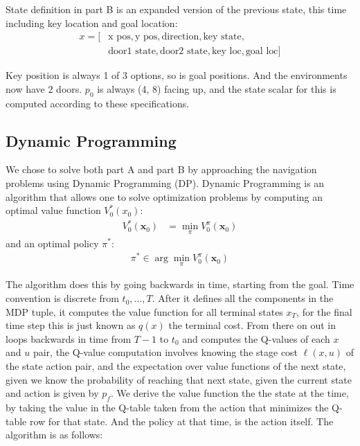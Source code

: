 \documentclass[conference]{IEEEtran}
\begin{document}
State definition in part B is an expanded version of the previous state, this time including key location and goal location:
\begin{align}
x = [&\text{x pos}, \text{y pos}, \text{direction}, \text{key state},\nonumber\\
     &\text{door1 state}, \text{door2 state}, \text{key loc}, \text{goal loc}]
\end{align}


Key position is always 1 of 3 options, so is goal positions. And the environments now have 2 doors.
$p_0$ is always (4, 8) facing up, and the state scalar for this is computed according to these specifications.


\subsection{Dynamic Programming}
We chose to solve both part A and part B by approaching the navigation problems using Dynamic Programming (DP). 
Dynamic Programming is an algorithm that allows one to solve optimization problems by computing an optimal value function
$V_0^{*}(x_0)$:
\begin{align}
V^*_0(\mathbf{x}_0) &= \min_{\pi} V^\pi_0(\mathbf{x}_0)
\end{align}
and an optimal policy $\pi^*$:
\begin{align}
\pi^* \in \arg\min_{\pi} V^\pi_0(\mathbf{x}_0)
\end{align}   

The algorithm does this by going backwards in time, starting from the goal. Time convention is discrete from $t_0,..., T$. After it defines all the components in the MDP tuple, it computes the value function for all terminal states $x_T$,
for the final time step this is just known as $q(x)$ the terminal cost. From there on out in loops backwards in time from $T-1$ to $t_0$ and computes the Q-values of each
$x$ and $u$ pair, the Q-value computation involves knowing the stage cost $\ell(x,u)$ of the state action pair, and the expectation over value functions of the next state, given
we know the probability of reaching that next state, given the current state and action is given by $p_f$. We derive the value function the the state at the time, by taking the 
value in the Q-table taken from the action that minimizes the Q-table row for that state. And the policy at that time, is the action itself. The algorithm is as follows:
\end{document}

